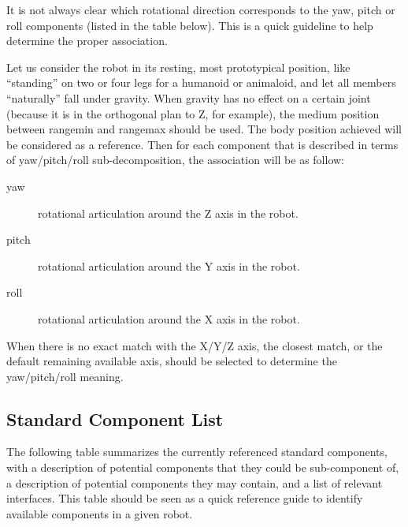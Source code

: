 It is not always clear which rotational direction corresponds to the
yaw, pitch or roll components (listed in the table below). This is a
quick guideline to help determine the proper association.

Let us consider the robot in its resting, most prototypical position,
like ``standing'' on two or four legs for a humanoid or animaloid, and
let all members ``naturally'' fall under gravity. When gravity has no
effect on a certain joint (because it is in the orthogonal plan to Z,
for example), the medium position between rangemin and rangemax should
be used. The body position achieved will be considered as a reference.
Then for each component that is described in terms of yaw/pitch/roll
sub-decomposition, the association will be as follow:

\begin{description}
\item[yaw] rotational articulation around the Z axis in the robot.
\item[pitch] rotational articulation around the Y axis in the robot.
\item[roll] rotational articulation around the X axis in the robot.
\end{description}

When there is no exact match with the X/Y/Z axis, the closest match, or
the default remaining available axis, should be selected to determine
the yaw/pitch/roll meaning.

\subsection{Standard Component List}
\label{sec:naming:components}

The following table summarizes the currently referenced standard
components, with a description of potential components that they could
be sub-component of, a description of potential components they may
contain, and a list of relevant interfaces. This table should be seen as a
quick reference guide to identify available components in a given
robot.

\newcommand{\component}[5]
{
  \lstindex{#1} &
  #5 &
  \code{#2} &
  \code{#3} &
  \code{#4}\\\hline
}

